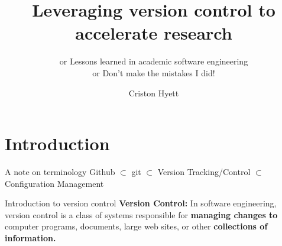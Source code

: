 \documentclass{beamer}
\begin{document}
\title{Leveraging version control to accelerate research}
\subtitle{or Lessons learned in academic software engineering\\ \small{or Don't make the mistakes I did!}}
\author{Criston Hyett}

\graphicspath{{./figs}}
\begin{frame}
  \maketitle

\end{frame}

\begin{frame}
  \tableofcontents
\end{frame}


\section{Introduction}
\begin{frame}{A note on terminology}
  Github $\subset$ git $\subset$ Version Tracking/Control $\subset$ Configuration Management
\end{frame}

\begin{frame}{Introduction to version control}
  \textbf{Version Control:} In software engineering, version control is a class of systems responsible for \textbf{managing changes to} computer programs, documents, large web sites, or other \textbf{collections of information.}
\end{frame}
\end{document}
